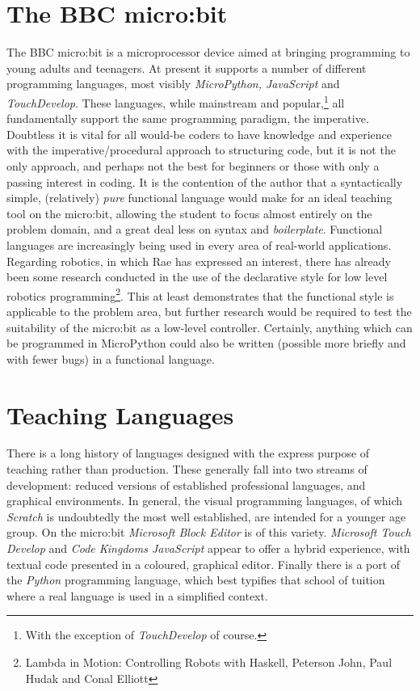 \documentclass[12pt, a4paper]{report}
\begin{document}
\section{The BBC micro:bit} The BBC micro:bit is a microprocessor device aimed at
bringing programming to young adults and teenagers. At present it supports a number of 
different programming languages, most visibly \textit{MicroPython, JavaScript} and \textit{TouchDevelop}.
These languages, while mainstream and popular,\footnote{With the exception of \textit{TouchDevelop}
    of course.} all fundamentally support the same programming paradigm, the imperative. Doubtless it is
vital for all would-be coders to have knowledge and experience with the imperative/procedural
approach to structuring code, but it is not the only approach, and perhaps not the best for
beginners or those with only a passing interest in coding. It is the contention of the author that a
syntactically simple, (relatively) \textit{pure} functional language would make for an ideal 
teaching tool on the micro:bit, allowing the student to focus almost entirely on the problem domain, 
and a great deal less on syntax and \textit{boilerplate}.
Functional languages are increasingly being used in every area of real-world applications. Regarding 
robotics, in which Rae has expressed an interest, there has already been some research conducted 
in the use of the declarative style for low level robotics programming\footnote{Lambda in Motion: Controlling
    Robots with Haskell, Peterson John, Paul Hudak and Conal Elliott}. This at least demonstrates
that the functional style is applicable to the problem area, but further research would be required
to test the suitability of the micro:bit as a low-level controller. Certainly, anything which can be
programmed in MicroPython could also be written (possible more briefly and with fewer bugs) in a
functional language.

\section{Teaching Languages}
There is a long history of languages designed with the express purpose of teaching rather than
production. These generally fall into two streams of development: reduced versions of established
professional languages, and graphical environments. In general, the visual programming languages, of
which \textit{Scratch} is undoubtedly the most well established, are intended for a younger age
group. On the micro:bit \textit{Microsoft Block Editor} is of this variety. 
\textit{Microsoft Touch Develop} and \textit{Code Kingdoms JavaScript} appear to offer a hybrid
experience, with textual code presented in a coloured, graphical editor. Finally there is a port of
the \textit{Python} programming language, which best typifies that school of tuition where a real
language is used in a simplified context.
\end{document}
